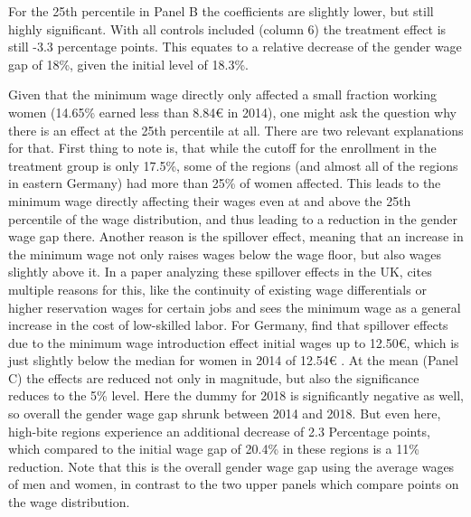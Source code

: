 \documentclass[12pt,draft,a4paper]{article}
\begin{document}
For the 25th percentile in Panel B the coefficients are slightly lower, but still highly significant.
With all controls included (column 6) the treatment effect is still -3.3 percentage points.
This equates to a relative decrease of the gender wage gap of 18\%, given the initial level of 18.3\%.

Given that the minimum wage directly only affected a small fraction working women (14.65\% earned less than 8.84€ in 2014), one might ask the question why there is an effect at the 25th percentile at all.
There are two relevant explanations for that.
First thing to note is, that while the cutoff for the enrollment in the treatment group is only 17.5\%,
some of the regions (and almost all of the regions in eastern Germany)
had more than 25\% of women affected. This leads to the minimum wage directly affecting their wages even at and above the 25th percentile of the wage distribution, and thus leading to a reduction in the gender wage gap there.
Another reason is the spillover effect, meaning that an increase in the minimum wage not only raises wages below the wage floor, but also wages slightly above it.
In a paper analyzing these spillover effects in the UK, \citet{Stewart12Wage} cites multiple reasons for this, like the continuity of existing wage differentials or higher reservation wages for certain jobs and sees the minimum wage as a general increase in the cost of low-skilled labor.
For Germany, \citet{Dustman21Reallocation} find that spillover effects due to the minimum wage introduction effect initial wages up to 12.50€, which is just slightly below the median for women in 2014 of 12.54€ \citep[see][Table 1]{CALIENDO22}. 
At the mean (Panel C) the effects are reduced not only in magnitude, but also the significance reduces to the 5\% level. 
Here the dummy for 2018 is significantly negative as well, so overall the gender wage gap shrunk between 2014 and 2018.
But even here, high-bite regions experience an additional decrease of 2.3 Percentage points, which compared to the initial wage gap of 20.4\% in these regions is a 11\% reduction.
Note that this is the overall gender wage gap using the average wages of men and women, in contrast to the two upper panels which compare points on the wage distribution.
\end{document}
